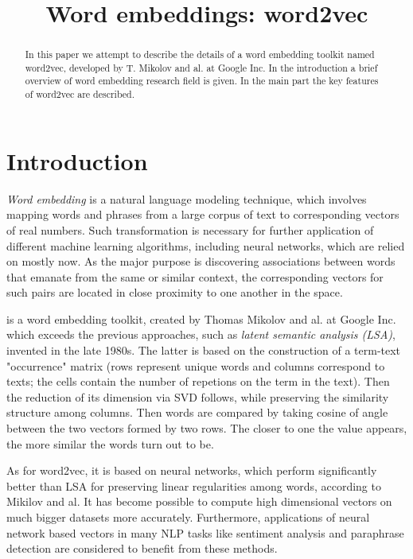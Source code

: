 \documentclass[conference, ]{IEEEtran}
\begin{document}
    
    \title{Word embeddings: word2vec}
    
    \author{
    }
    
    \maketitle
    
    \begin{abstract}In this paper we attempt to describe the details of a word embedding toolkit named word2vec, developed  by T. Mikolov and al. at Google Inc. In the introduction a brief overview of word embedding research field is given. In the main part the key features of word2vec are described.
    \end{abstract}
    
    \section*{Introduction}
    \textit{Word embedding} is a natural language modeling technique, which involves mapping words and phrases from a large corpus of text to corresponding vectors of real numbers. Such transformation is necessary for further application of different machine learning algorithms, including neural networks, which are relied on mostly now. As the major purpose is discovering associations between words that emanate from the same or similar context, the corresponding vectors for such pairs are located in close proximity to one another in the space.
    
     is a word embedding toolkit, created by Thomas Mikolov and al. at Google Inc. which exceeds the previous approaches, such as \textit{latent semantic analysis (LSA)}, invented in the late 1980s. The latter is based on the construction of a term-text "occurrence" matrix (rows represent unique words and columns correspond to texts; the cells contain the number of repetions on the term in the text). Then the reduction of its dimension via SVD follows, while preserving the similarity structure among columns. Then words are compared by taking cosine of angle between the two vectors formed by two rows. The closer to one the value appears, the more similar the words turn out to be. 
    
    As for word2vec, it is based on neural networks, which perform significantly better than LSA for preserving linear regularities among words, according to Mikilov and al\cite{mikolov1}. It has become possible to compute high dimensional vectors on much bigger datasets more accurately. Furthermore, applications of neural network based vectors in many NLP tasks like sentiment analysis and paraphrase detection are considered to benefit from these methods\cite{mikolov1}.
    
\end{document}
